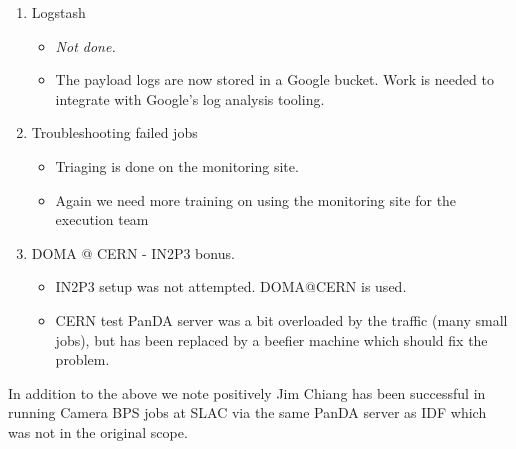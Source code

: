 \begin{enumerate}
\begin{itemize}
\end{itemize}
\item Logstash
\begin{itemize}
\item \emph{ Not done. }
\item The payload logs are now stored in a Google bucket. Work is needed to integrate with Google's log analysis tooling.

\end{itemize}
\item Troubleshooting failed jobs
\begin{itemize}
\item Triaging is done on the monitoring site.
\item Again we need more training on using the monitoring site for the execution team
\end{itemize}
\item  DOMA @ CERN  - IN2P3 bonus.
\begin{itemize}
\item IN2P3 setup was not attempted.  DOMA@CERN is used.
\item CERN test PanDA server was a bit overloaded by the traffic (many small jobs), but has been replaced by a beefier machine which should fix the problem.
\end{itemize}
\end{enumerate}

In addition to the above we note positively Jim Chiang has been successful in running Camera BPS jobs at SLAC via the same PanDA server as IDF
which was not in the original scope.


